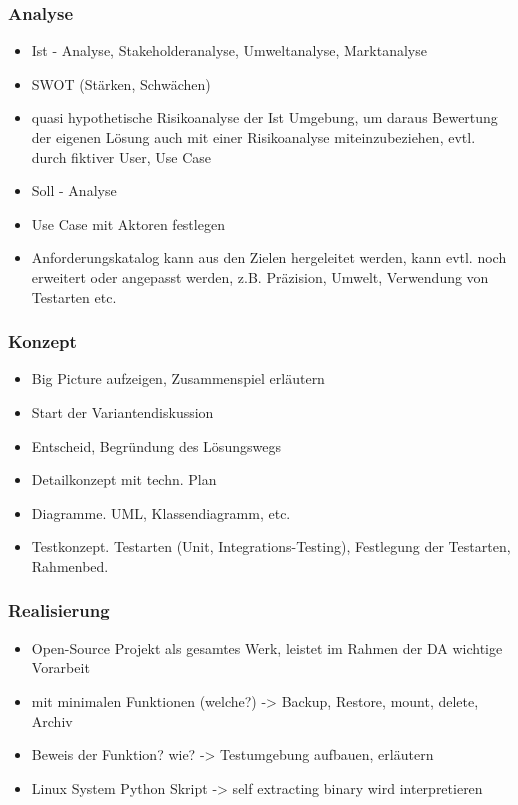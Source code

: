 \documentclass[a4paper,11pt]{article}
\begin{document}
\subsubsection*{Analyse}
\label{sec:orgaa137c0}

\begin{itemize}
\item Ist - Analyse, Stakeholderanalyse, Umweltanalyse, Marktanalyse
\item SWOT (Stärken, Schwächen)
\item quasi hypothetische Risikoanalyse der Ist Umgebung, um daraus Bewertung der
eigenen Lösung auch mit einer Risikoanalyse miteinzubeziehen, evtl. durch
fiktiver User, Use Case
\item Soll - Analyse
\item Use Case mit Aktoren festlegen
\item Anforderungskatalog kann aus den Zielen hergeleitet werden, kann evtl. noch
erweitert oder angepasst werden, z.B. Präzision, Umwelt, Verwendung von
Testarten etc.
\end{itemize}

\subsubsection*{Konzept}
\label{sec:org86ed441}

\begin{itemize}
\item Big Picture aufzeigen, Zusammenspiel erläutern
\item Start der Variantendiskussion
\item Entscheid, Begründung des Lösungswegs
\item Detailkonzept mit techn. Plan
\item Diagramme. UML, Klassendiagramm, etc.
\item Testkonzept. Testarten (Unit, Integrations-Testing), Festlegung der
Testarten, Rahmenbed.
\end{itemize}

\subsubsection*{Realisierung}
\label{sec:org5a3b2e4}

\begin{itemize}
\item Open-Source Projekt als gesamtes Werk, leistet im Rahmen der DA wichtige
Vorarbeit
\item mit minimalen Funktionen (welche?) -> Backup, Restore, mount, delete, Archiv
\item Beweis der Funktion? wie? -> Testumgebung aufbauen, erläutern
\item Linux System Python Skript -> self extracting binary wird interpretieren
\end{itemize}
\end{document}
